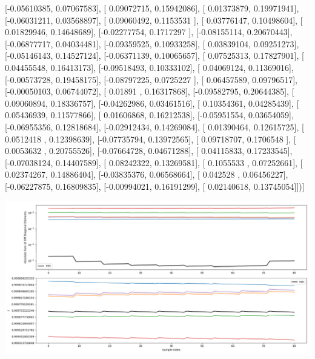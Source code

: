 \documentclass{article}
\begin{document}
       [-0.05610385,  0.07067583],
       [ 0.09072715,  0.15942086],
       [ 0.01373879,  0.19971941],
       [-0.06031211,  0.03568897],
       [ 0.09060492,  0.1153531 ],
       [ 0.03776147,  0.10498604],
       [ 0.01829946,  0.14648689],
       [-0.02277754,  0.1717297 ],
       [-0.08155114,  0.20670443],
       [-0.06877717,  0.04034481],
       [-0.09359525,  0.10933258],
       [ 0.03839104,  0.09251273],
       [-0.05146143,  0.14527124],
       [-0.06371139,  0.10065657],
       [ 0.07525313,  0.17827901],
       [ 0.04455548,  0.16413173],
       [-0.09518493,  0.10333102],
       [ 0.04069124,  0.11369016],
       [-0.00573728,  0.19458175],
       [-0.08797225,  0.0725227 ],
       [ 0.06457589,  0.09796517],
       [-0.00050103,  0.06744072],
       [ 0.01891   ,  0.16317868],
       [-0.09582795,  0.20644385],
       [ 0.09060894,  0.18336757],
       [-0.04262986,  0.03461516],
       [ 0.10354361,  0.04285439],
       [ 0.05436939,  0.11577866],
       [ 0.01606868,  0.16212538],
       [-0.05951554,  0.03654059],
       [-0.06955356,  0.12818684],
       [-0.02912434,  0.14269084],
       [ 0.01390464,  0.12615725],
       [ 0.0512418 ,  0.12398639],
       [-0.07735794,  0.13972565],
       [ 0.09718707,  0.1706548 ],
       [ 0.0053632 ,  0.20755526],
       [-0.07664728,  0.04671288],
       [ 0.04115833,  0.17233545],
       [-0.07038124,  0.14407589],
       [ 0.08242322,  0.13269581],
       [ 0.1055533 ,  0.07252661],
       [ 0.02374267,  0.14886404],
       [-0.03835376,  0.06568664],
       [ 0.042528  ,  0.06456227],
       [-0.06227875,  0.16809835],
       [-0.00994021,  0.16191299],
       [ 0.02140618,  0.13745054]])]
\begin{center}
\includegraphics[scale=.9]{report_pickled_controls167/control_dpn_all.png}

\end{center}
\end{document}
